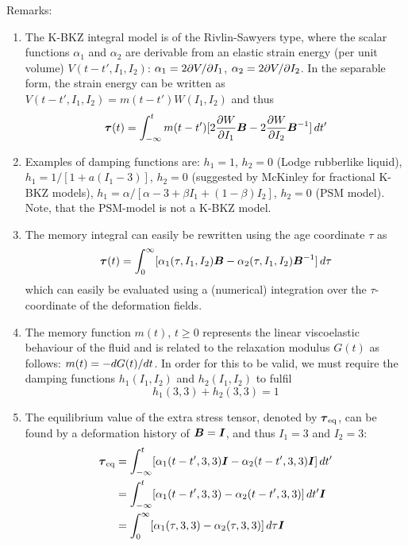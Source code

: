 Remarks:
\begin{enumerate}
\item
The K-BKZ integral model is of the Rivlin-Sawyers type, where the scalar functions $\alpha_1$ and $\alpha_2$ are derivable from an elastic strain energy (per unit volume) $V(t-t',I_1,I_2)$: $\alpha_1=2\partial V/\partial I_1$, $\alpha_2=2\partial V/\partial I_2$. In the separable form, the strain energy can be written as $V(t-t',I_1,I_2)=m(t-t')W(I_1,I_2)$ and thus
\begin{equation}
  \boldsymbol{\tau}(t) = \int_{-\infty}^tm(t-t')[2\dfrac{\partial W}{\partial I_1}\boldsymbol{B}-2\dfrac{\partial W}{\partial I_2}\boldsymbol{B}^{-1}]\,dt'
\end{equation}
\item Examples of damping functions are:
$h_1=1$, $h_2=0$ (Lodge rubberlike liquid), $h_1=1/[1+a(I_1-3)]$, $h_2=0$ (suggested by McKinley \cite{Jaishankar2014} for fractional K-BKZ models), $h_1=\alpha/[\alpha-3+\beta I_1+(1-\beta)I_2]$, $h_2=0$ (PSM model). Note, that the PSM-model is not a K-BKZ model.
\item The memory integral can easily be rewritten using the age coordinate $\tau$ as
\begin{equation}
  \boldsymbol{\tau}(t) = \int_{0}^\infty[\alpha_1(\tau,I_1,I_2)\boldsymbol{B}-\alpha_2(\tau,I_1,I_2)\boldsymbol{B}^{-1}]\,d\tau
  \label{eq:intstress}
\end{equation}
which can easily be evaluated using a (numerical) integration over the $\tau$-coordinate of the deformation fields.
\item The memory function $m(t)$, $t\geq 0$ represents the linear viscoelastic behaviour of the fluid and is related to the relaxation modulus $G(t)$ as follows: $m(t)=-d G(t) / d t$. In order for this to be valid, we must require
the damping functions $h_1(I_1,I_2)$ and $h_2(I_1,I_2)$ to fulfil
\begin{equation} 
 h_1(3,3)+h_2(3,3)=1
 \label{eq:h1plush2iszero} 
\end{equation}
\item The equilibrium value of the extra stress tensor, denoted by $\boldsymbol{\tau}_\text{eq}$, can be found by a deformation history of $\boldsymbol{B}=\boldsymbol{I}$, and thus $I_1=3$ and $I_2=3$:
\begin{equation} 
\begin{split}
  \ten\tau_\text{eq} &= \int_{-\infty}^t[\alpha_1(t-t',3,3)\ten I-\alpha_2(t-t',3,3)\ten I]\,dt'\\
      &= \int_{-\infty}^t[\alpha_1(t-t',3,3)-\alpha_2(t-t',3,3)]\,dt'\ten I\\
      &= \int_{0}^{\infty}[\alpha_1(\tau,3,3)-\alpha_2(\tau,3,3)]\,d\tau\ten I

\end{split}
\end{equation}
\end{enumerate}
